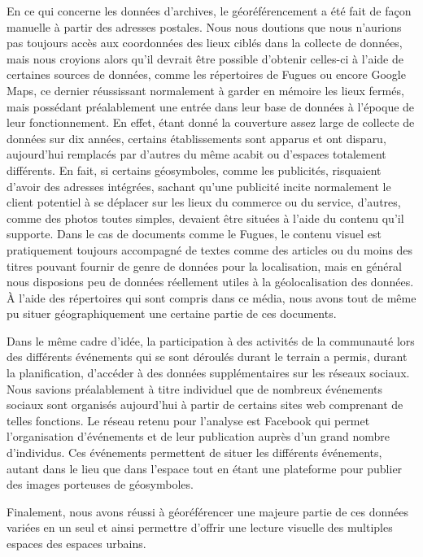 En ce qui concerne les données d'archives, le géoréférencement a été fait de façon manuelle à partir des adresses postales. 
Nous nous doutions que nous n'aurions pas toujours accès aux coordonnées des lieux ciblés dans la collecte de données, mais nous croyions alors qu'il devrait être possible d'obtenir celles-ci à l'aide de certaines sources de données, comme les répertoires de Fugues ou encore Google Maps, ce dernier réussissant normalement à garder en mémoire les lieux fermés, mais possédant préalablement une entrée dans leur base de données à l'époque de leur fonctionnement. 
En effet, étant donné la couverture assez large de collecte de données sur dix années, certains établissements sont apparus et ont disparu, aujourd'hui remplacés par d'autres du même acabit ou d'espaces totalement différents. 
En fait, si certains géosymboles, comme les publicités, risquaient d'avoir des adresses intégrées, sachant qu'une publicité incite normalement le client potentiel à se déplacer sur les lieux du commerce ou du service, d'autres, comme des photos toutes simples, devaient être situées à l'aide du contenu qu'il supporte.  
Dans le cas de documents comme le Fugues, le contenu visuel est pratiquement toujours accompagné de textes comme des articles ou du moins des titres pouvant fournir de genre de données pour la localisation, mais en général nous disposions peu de données réellement utiles à la géolocalisation des données. 
À l'aide des répertoires qui sont compris dans ce média, nous avons tout de même pu situer géographiquement une certaine partie de ces documents.

Dans le même cadre d'idée, la participation à des activités de la communauté \lgbt{} lors des différents événements qui se sont déroulés durant le terrain a permis, durant la planification, d'accéder à des données supplémentaires sur les réseaux sociaux. 
Nous savions préalablement à titre individuel que de nombreux événements sociaux sont organisés aujourd'hui à partir de certains sites web comprenant de telles fonctions. 
Le réseau retenu pour l'analyse est Facebook qui permet l'organisation d'événements et de leur publication auprès d'un grand nombre d'individus. 
Ces événements permettent de situer les différents événements, autant dans le lieu que dans l'espace tout en étant une plateforme pour publier des images porteuses de géosymboles.
\citep{Barkhuus2010} \citep{Boyd2010}

Finalement, nous avons réussi à géoréférencer une majeure partie de ces données variées en un seul \sig{} et ainsi permettre d'offrir une lecture visuelle des multiples espaces \qus{} des espaces urbains.

